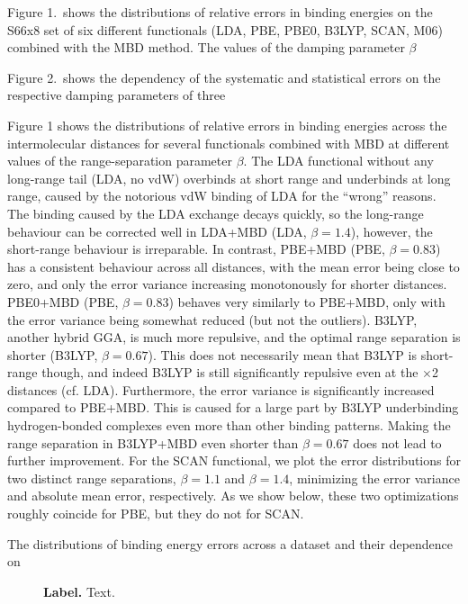 Figure 1.\ shows the distributions of relative errors in binding energies on the S66x8 set of six different functionals (LDA, PBE, PBE0, B3LYP, SCAN, M06) combined with the MBD method.
The values of the damping parameter $\beta$ 

Figure 2.\ shows the dependency of the systematic and statistical errors on the respective damping parameters of three 

Figure 1 shows the distributions of relative errors in binding energies across the intermolecular distances for several functionals combined with MBD at different values of the range-separation parameter $\beta$.
The LDA functional without any long-range tail (LDA, no vdW) overbinds at short range and underbinds at long range, caused by the notorious vdW binding of LDA for the ``wrong'' reasons.
The binding caused by the LDA exchange decays quickly, so the long-range behaviour can be corrected well in LDA+MBD (LDA, $\beta=1.4$), however, the short-range behaviour is irreparable.
In contrast, PBE+MBD (PBE, $\beta=0.83$) has a consistent behaviour across all distances, with the mean error being close to zero, and only the error variance increasing monotonously for shorter distances.
PBE0+MBD (PBE, $\beta=0.83$) behaves very similarly to PBE+MBD, only with the error variance being somewhat reduced (but not the outliers).
B3LYP, another hybrid GGA, is much more repulsive, and the optimal range separation is shorter (B3LYP, $\beta=0.67$).
This does not necessarily mean that B3LYP is short-range though, and indeed B3LYP is still significantly repulsive even at the $\times$2 distances (cf. LDA).
Furthermore, the error variance is significantly increased compared to PBE+MBD\@.
This is caused for a large part by B3LYP underbinding hydrogen-bonded complexes even more than other binding patterns.
Making the range separation in B3LYP+MBD even shorter than $\beta=0.67$ does not lead to further improvement.
For the SCAN functional, we plot the error distributions for two distinct range separations, $\beta=1.1$ and $\beta=1.4$, minimizing the error variance and absolute mean error, respectively.
As we show below, these two optimizations roughly coincide for PBE, but they do not for SCAN\@.

The distributions of binding energy errors across a dataset and their dependence on 

\begin{figure}
\caption{\textbf{Label.} Text.
}\label{fig:s66-dists}
\end{figure}

